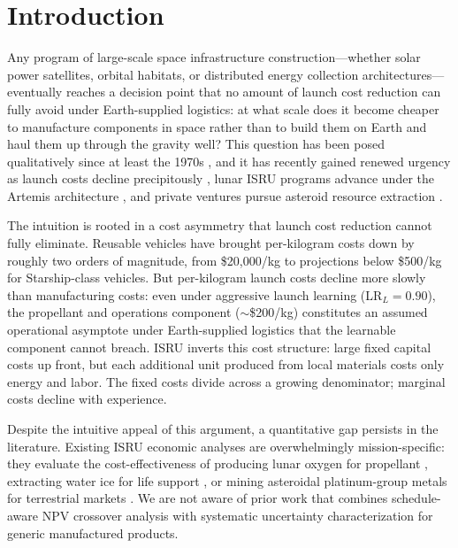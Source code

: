 \documentclass[preprint,12pt]{elsarticle}
\begin{document}
\linenumbers

\section{Introduction}
\label{sec:introduction}

Any program of large-scale space infrastructure construction---whether solar power satellites, orbital habitats, or distributed energy collection architectures---eventually reaches a decision point that no amount of launch cost reduction can fully avoid under Earth-supplied logistics: at what scale does it become cheaper to manufacture components in space rather than to build them on Earth and haul them up through the gravity well? This question has been posed qualitatively since at least the 1970s \cite{oneill1974,oneill1976}, and it has recently gained renewed urgency as launch costs decline precipitously \cite{jones2018}, lunar ISRU programs advance under the Artemis architecture \cite{sanders2015}, and private ventures pursue asteroid resource extraction \cite{elvis2012,andrews2015}.

The intuition is rooted in a cost asymmetry that launch cost reduction cannot fully eliminate. Reusable vehicles have brought per-kilogram costs down by roughly two orders of magnitude, from \$20{,}000/kg to projections below \$500/kg for Starship-class vehicles. But per-kilogram launch costs decline more slowly than manufacturing costs: even under aggressive launch learning (LR$_L = 0.90$), the propellant and operations component ($\sim$\$200/kg) constitutes an assumed operational asymptote under Earth-supplied logistics that the learnable component cannot breach. ISRU inverts this cost structure: large fixed capital costs up front, but each additional unit produced from local materials costs only energy and labor. The fixed costs divide across a growing denominator; marginal costs decline with experience.

Despite the intuitive appeal of this argument, a quantitative gap persists in the literature. Existing ISRU economic analyses are overwhelmingly mission-specific: they evaluate the cost-effectiveness of producing lunar oxygen for propellant \cite{sanders2015}, extracting water ice for life support \cite{zubrin1996}, or mining asteroidal platinum-group metals for terrestrial markets \cite{sonter1997,elvis2012}. We are not aware of prior work that combines schedule-aware NPV crossover analysis with systematic uncertainty characterization for generic manufactured products.
\end{document}
